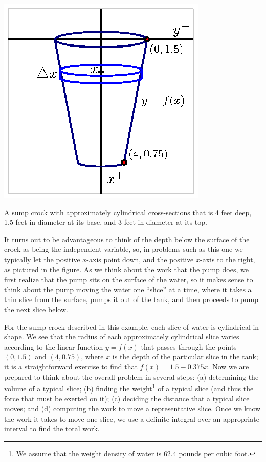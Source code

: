 \begin{marginfigure} %
\includegraphics{figures/6_4_Crock.eps}
\caption{A sump crock with approximately cylindrical cross-sections that is 4 feet deep, 1.5 feet in diameter at its base, and 3 feet in diameter at its top.} \label{F:6.4.Crock}
\end{marginfigure}

It turns out to be advantageous to think of the depth below the surface of the crock as being the independent variable, so, in problems such as this one we typically let the positive $x$-axis point down, and the positive $x$-axis to the right, as pictured in the figure.  As we think about the work that the pump does, we first realize that the pump sits on the surface of the water, so it makes sense to think about the pump moving the water one ``slice'' at a time, where it takes a thin slice from the surface, pumps it out of the tank, and then proceeds to pump the next slice below.

For the sump crock described in this example, each slice of water is cylindrical in shape.  We see that the radius of each approximately cylindrical slice varies according to the linear function $y = f(x)$ that passes through the points $(0,1.5)$ and $(4,0.75)$, where $x$ is the depth of the particular slice in the tank; it is a straightforward exercise to find that $f(x) = 1.5 - 0.375x$.  Now we are prepared to think about the overall problem in several steps:  (a) determining the volume of a typical slice; (b) finding the weight\footnote{We assume that the weight density of water  is $62.4$ pounds per cubic foot.} of a typical slice (and thus the force that must be exerted on it); (c) deciding the distance that a typical slice moves; and (d) computing the work to move a representative slice.  Once we know the work it takes to move one slice, we use a definite integral over an appropriate interval to find the total work.

